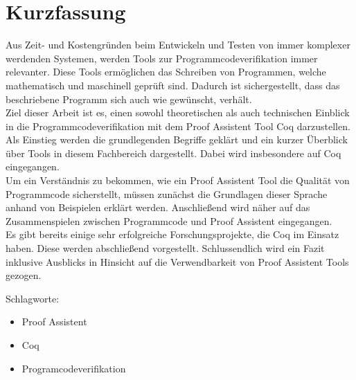 \section*{Kurzfassung}
\thispagestyle{empty}


Aus Zeit- und Kostengründen beim Entwickeln und Testen von immer komplexer werdenden Systemen, werden Tools zur Programmcodeverifikation immer relevanter.
Diese Tools ermöglichen das Schreiben von Programmen, welche mathematisch und maschinell geprüft sind. Dadurch ist sichergestellt, dass das beschriebene Programm sich auch wie gewünscht, verhält.\\
Ziel dieser Arbeit ist es, einen sowohl theoretischen als auch technischen Einblick in die Programmcodeverifikation mit dem Proof Assistent Tool Coq darzustellen.
Als Einstieg werden die grundlegenden Begriffe geklärt und ein kurzer Überblick über Tools in diesem Fachbereich dargestellt. Dabei wird insbesondere auf Coq eingegangen.\\
Um ein Verständnis zu bekommen, wie ein Proof Assistent Tool die Qualität von Programmcode sicherstellt, müssen zunächst die Grundlagen dieser Sprache anhand von Beispielen erklärt werden. Anschließend wird näher auf das Zusammenspielen zwischen Programmcode und Proof Assistent eingegangen.\\
Es gibt bereits einige sehr erfolgreiche Forschungsprojekte, die Coq im Einsatz haben. Diese werden abschließend vorgestellt. Schlussendlich wird ein Fazit inklusive Ausblicks in Hinsicht auf die Verwendbarkeit von Proof Assistent Tools gezogen.
\bigskip

\noindent
Schlagworte:
\begin{itemize}
	\item Proof Assistent
	\item Coq
	\item Programcodeverifikation
\end{itemize}


